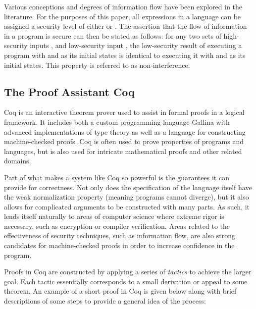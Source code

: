 \documentclass[12pt]{report}
\begin{document}
 Various conceptions and degrees of information flow have been
 explored in the literature. For the purposes of this paper, all
 expressions in a language can be assigned a security level of either
  or . The assertion that the flow of
 information in a program is secure can then be stated as follows:
 for any two sets of high-security inputs ,
  and low-security input , the
 low-security result of executing a program with  and
  as its initial states is identical to executing it
 with  and  as its initial states. This
 property is referred to as non-interference. 

\subsection{The Proof Assistant Coq}



Coq is an interactive theorem prover used to assist in formal proofs
in a logical framework. It includes both a custom programming
language Gallina with advanced implementations of type theory as well
as a language for constructing machine-checked proofs. Coq is often
used to prove properties of programs and languages, but is also used
for intricate mathematical proofs and other related domains.


Part of what makes a system like Coq so powerful is the guarantees it
can provide for correctness. Not only does the specification of the
language itself have the weak normalization property (meaning
programs cannot diverge), but it also allows for complicated
arguments to be constructed with many parts. As such, it lends itself
naturally to areas of computer science where extreme rigor is
necessary, such as encryption or compiler verification. Areas related
to the effectiveness of security techniques, such as information
flow, are also strong candidates for machine-checked proofs in order
to increase confidence in the program.


Proofs in Coq are constructed by applying a series of \emph{tactics}
to achieve the larger goal. Each tactic essentially corresponds to
a small derivation or appeal to some theorem. An example of a short
proof in Coq is given below along with brief descriptions of some
steps to provide a general idea of the process:
\end{document}
